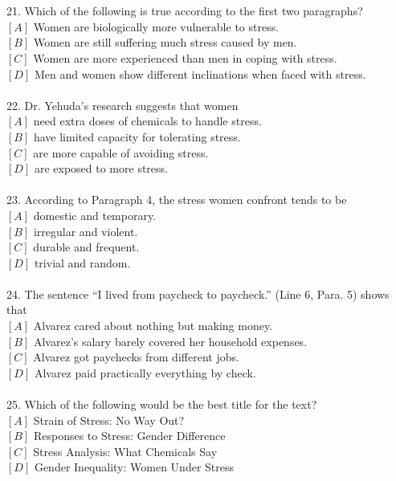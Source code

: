 \documentclass[a4paper]{ctexart}
\begin{document}
\\
\\
21.	Which of the following is true according to the first two paragraphs?\\
$[A]$ Women are biologically more vulnerable to stress.\\
$[B]$ Women are still suffering much stress caused by men.\\
$[C]$ Women are more experienced than men in coping with stress.\\
$[D]$ Men and women show different inclinations when faced with stress.\\
\\
22.	Dr. Yehuda’s research suggests that women\\
$[A]$ need extra doses of chemicals to handle stress.\\
$[B]$ have limited capacity for tolerating stress.\\
$[C]$ are more capable of avoiding stress.\\
$[D]$ are exposed to more stress.\\
\\
23.	According to Paragraph 4, the stress women confront tends to be\\
$[A]$ domestic and temporary.\\
$[B]$ irregular and violent.\\
$[C]$ durable and frequent.\\
$[D]$ trivial and random.\\
\\
24.	The sentence “I lived from paycheck to paycheck.” (Line 6, Para. 5) shows that\\
$[A]$ Alvarez cared about nothing but making money.\\
$[B]$ Alvarez’s salary barely covered her household expenses.\\
$[C]$ Alvarez got paychecks from different jobs.\\
$[D]$ Alvarez paid practically everything by check.\\
\\
25.	Which of the following would be the best title for the text?\\
$[A]$ Strain of Stress: No Way Out?\\
$[B]$ Responses to Stress: Gender Difference\\
$[C]$ Stress Analysis: What Chemicals Say\\
$[D]$ Gender Inequality: Women Under Stress\\
\end{document}
